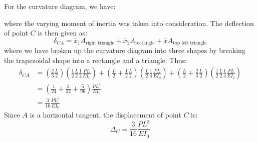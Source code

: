 \documentclass{article}
\begin{document}
For the curvature diagram, we have:
\begin{center}
\end{center}
where the varying moment of inertia was taken into consideration. The deflection of point $C$ is then given as:
\begin{equation}
    \delta_{CA} = \bar{x}_1A_\text{right triangle} + \bar{x}_2A_\text{rectangle} + \bar{x}A_\text{top left triangle}
    \label{eq:}
\end{equation}
where we have broken up the curvature diagram into three shapes by breaking the trapezoidal shape into a rectangle and a triangle. Thus:
\begin{align}
    \delta_{CA}&=\left(\frac{2}{3}\frac{L}{2}\right)\left(\frac{1}{2}\frac{L}{2}\frac{1}{2}\frac{PL}{EI_0}\right)+\left(\frac{L}{2}+\frac{1}{2}\frac{L}{2}\right)\left(\frac{L}{2}\frac{1}{4}\frac{PL}{EI_0}\right)+\left(\frac{L}{2}+\frac{2}{3}\frac{L}{2}\right)\left(\frac{1}{2}\frac{L}{2}\frac{1}{4}\frac{PL}{EI_0}\right) \\ &= \left(\frac{1}{24}+\frac{3}{32}+\frac{5}{96}\right)\frac{PL^3}{EI_0} \\ &=\frac{3}{16}\frac{PL^3}{EI_0}
\end{align}
Since $A$ is a horizontal tangent, the displacement of point $C$ is:
\begin{equation}
    \Delta_C = \frac{3}{16}\frac{PL^3}{EI_0}
    \label{eq:}
\end{equation}

\newpage
\end{document}
